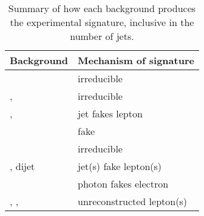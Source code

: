 \begin{table}[t]
	\begin{tabular}{l@{\hskip 0.3in}l}
		\toprule
		Background        & Mechanism of \HepProcess{\Plepton\Plepton + \met} signature \\
		\midrule
		\WW               & irreducible \\
		\ttbar, \HepProcess{\Ptop\PW} & irreducible \\
		\HepProcess{\Ptop\Pbottom}, \HepProcess{\Ptop\Pbottom\Pquark} & jet fakes lepton \\
		\DYll             & fake \met \\
		\DYtt             & irreducible \\
		\Wjets, dijet     & jet(s) fake lepton(s) \\
		\Wgamma           & photon fakes electron \\
		\WZ, \Wgstar, \ZZ & unreconstructed lepton(s) \\
		\bottomrule
	\end{tabular}
	\caption{Summary of how each background produces the 
	\HepProcess{\Plepton\Plepton + \met} experimental signature, inclusive in the number of 
	jets.}
	\label{tab:bkg_summary}
\end{table}
